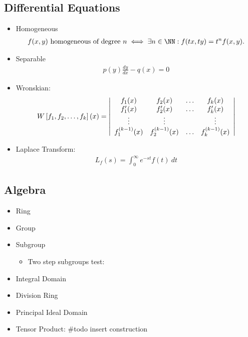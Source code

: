 \hypertarget{differential-equations}{%
\subsection{Differential Equations}\label{differential-equations}}

\begin{itemize}
\item
  Homogeneous
  \begin{align*}
    f(x, y) \text{ homogeneous of degree } n \iff \exists n\in\NN : f(tx, ty) = t^nf(x, y).
    \end{align*}
\item
  Separable
  \begin{align*}
    p(y)\frac{dy}{dx} - q(x) = 0
    \end{align*}
\item
  Wronskian:
  \begin{align*}
  W \left[ f _ { 1 } , f _ { 2 } , \ldots , f _ { k } \right] ( x ) = \left| \begin{array} { c c c c } { f _ { 1 } ( x ) } & { f _ { 2 } ( x ) } & { \dots } & { f _ { k } ( x ) } \\ { f _ { 1 } ^ { \prime } ( x ) } & { f _ { 2 } ^ { \prime } ( x ) } & { \dots } & { f _ { k } ^ { \prime } ( x ) } \\ { \vdots } & { \vdots } & { } & { \vdots } \\ { f _ { 1 } ^ { ( k - 1 ) } ( x ) } & { f _ { 2 } ^ { ( k - 1 ) } ( x ) } & { \dots } & { f _ { k } ^ { ( k - 1 ) } ( x ) } \end{array} \right|
  \end{align*}
\item
  Laplace Transform:
  \begin{align*}
  L_f(s) = \int_0^\infty e^{-st} f(t) ~dt
  \end{align*}
\end{itemize}

\hypertarget{algebra}{%
\subsection{Algebra}\label{algebra}}

\begin{itemize}
\tightlist
\item
  Ring
\item
  Group
\item
  Subgroup

  \begin{itemize}
  \tightlist
  \item
    Two step subgroups test:
  \end{itemize}
\item
  Integral Domain
\item
  Division Ring
\item
  Principal Ideal Domain
\item
  Tensor Product: \#todo insert construction
\end{itemize}

